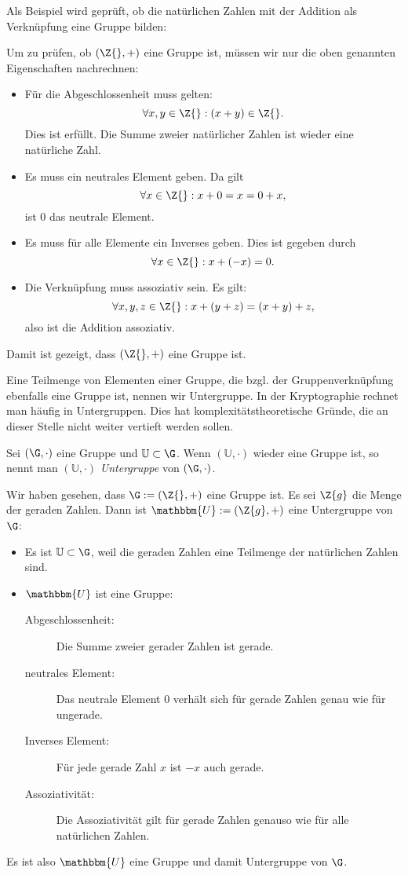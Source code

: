 Als Beispiel wird geprüft, ob die natürlichen Zahlen mit der Addition
als Verknüpfung eine Gruppe bilden:
\begin{beispiel}
  Um zu prüfen, ob \((\Z{}, +)\) eine Gruppe ist, müssen
  wir nur die oben genannten Eigenschaften nachrechnen:
  \begin{itemize}
  \item Für die Abgeschlossenheit muss gelten: 
    \[\forall x, y \in \Z{}: (x+y)\in \Z{}. \] 
     Dies ist erfüllt. Die Summe zweier natürlicher Zahlen ist wieder
     eine natürliche Zahl.
  \item Es muss ein neutrales Element geben. Da gilt 
    \[\forall x \in \Z{}: x+0 = x = 0+x, \] ist $0$ das neutrale Element.
  \item Es muss für alle Elemente ein Inverses geben. Dies ist gegeben
    durch \[\forall x \in \Z{}: x + (-x) = 0.\]
  \item Die Verknüpfung muss assoziativ sein. Es gilt:
    \[\forall x, y, z \in \Z{}: x + (y+z)=(x+y)+z,\] also ist die
    Addition assoziativ.
  \end{itemize}
  Damit ist gezeigt, dass $(\Z{}, +)$ eine Gruppe ist.
\end{beispiel}

Eine Teilmenge von Elementen einer Gruppe, die bzgl. der
Gruppenverknüpfung ebenfalls eine Gruppe ist, nennen wir Untergruppe. In
der Kryptographie rechnet man häufig in Untergruppen. Dies hat
komplexitätstheoretische Gründe, die an dieser Stelle nicht weiter
vertieft werden sollen. 

\begin{definition}[Untergruppe]
  Sei $(\G, \cdot)$ eine Gruppe und $\mathbb{U} \subset \G$. Wenn
  $(\mathbb{U}, \cdot)$ wieder eine Gruppe ist, so nennt man $(\mathbb{U},
  \cdot)$ \textit{Untergruppe} von $(\G, \cdot)$.
\end{definition}

\begin{beispiel}
  Wir haben gesehen, dass $\G := (\Z{}, +)$ eine Gruppe ist. Es sei
  $\Z{g}$ die Menge der geraden Zahlen. Dann ist $\mathbbm{U} := (\Z{g},
  +)$ eine Untergruppe von $\G$:
  \begin{itemize}
  \item Es ist $\mathbb{U} \subset \G$, weil die geraden Zahlen eine
     Teilmenge der natürlichen Zahlen sind.
  \item $\mathbbm{U}$ ist eine Gruppe:
    \begin{description}
    \item[Abgeschlossenheit:] Die Summe zweier gerader Zahlen ist gerade.
    \item[neutrales Element:] Das neutrale Element $0$ verhält sich für
      gerade Zahlen genau wie für ungerade.
    \item[Inverses Element:] Für jede gerade Zahl $x$ ist $-x$ auch
      gerade.
    \item[Assoziativität:] Die Assoziativität gilt für gerade Zahlen
      genauso wie für alle natürlichen Zahlen.
    \end{description}
  \end{itemize}
  Es ist also $\mathbbm{U}$ eine Gruppe und damit Untergruppe von $\G$.
\end{beispiel}

